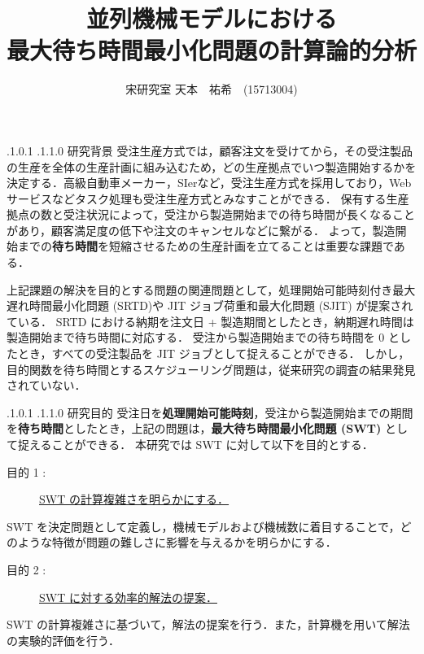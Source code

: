 \documentclass[oneside, 10pt, twocolumn]{jarticle}
\title{\bf{\rm
並列機械モデルにおける\\最大待ち時間最小化問題の計算論的分析}}
\author{宋研究室
\hspace{15pt}
天本　祐希　(15713004)}
\date{}
\makeatletter
\def\section{\@startsection {section}{1}{\z@}{-3.5ex plus -1ex minus
-.2ex}{2.3 ex plus .2ex}{\large\bf}}
\renewcommand{\section}{
\@startsection{section}{1}{\z@}
{.1\Cvs \@plus.0\Cdp \@minus.1\Cdp}%
{.1\Cvs \@plus.1\Cdp \@minus.0\Cdp}%
{\reset@font\large\bfseries}}      %
\makeatother
\begin{document}
\maketitle
\thispagestyle{empty}
\section{研究背景}
受注生産方式では，顧客注文を受けてから，その受注製品の生産を全体の生産計画に組み込むため，どの生産拠点でいつ製造開始するかを決定する．高級自動車メーカー，SIerなど，受注生産方式を採用しており，Web サービスなどタスク処理も受注生産方式とみなすことができる．
保有する生産拠点の数と受注状況によって，受注から製造開始までの待ち時間が長くなることがあり，顧客満足度の低下や注文のキャンセルなどに繋がる．
よって，製造開始までの{\bf 待ち時間}を短縮させるための生産計画を立てることは重要な課題である．

上記課題の解決を目的とする問題の関連問題として，処理開始可能時刻付き最大遅れ時間最小化問題 (SRTD)や JIT ジョブ荷重和最大化問題 (SJIT) が提案されている．
SRTD における納期を注文日 + 製造期間としたとき，納期遅れ時間は製造開始まで待ち時間に対応する．
受注から製造開始までの待ち時間を 0 としたとき，すべての受注製品を JIT ジョブとして捉えることができる．
しかし，目的関数を待ち時間とするスケジューリング問題は，従来研究の調査の結果発見されていない．

\section{研究目的}
受注日を{\bf 処理開始可能時刻}，受注から製造開始までの期間を{\bf 待ち時間}としたとき，上記の問題は，{\bf 最大待ち時間最小化問題 (SWT) }として捉えることができる．
本研究では SWT に対して以下を目的とする．
\begin{description}
  \item[目的 1 :]
  \underline{SWT の計算複雑さを明らかにする．}
\end{description}
SWT を決定問題として定義し，機械モデルおよび機械数に着目することで，どのような特徴が問題の難しさに影響を与えるかを明らかにする．

\begin{description}
  \item[目的 2 :]
  \underline{SWT に対する効率的解法の提案．}
\end{description}
SWT の計算複雑さに基づいて，解法の提案を行う．また，計算機を用いて解法の実験的評価を行う．
\end{document}
